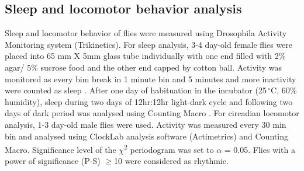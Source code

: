 \subsection*{Sleep and locomotor behavior analysis}

Sleep and locomotor behavior of flies were measured using Drosophila Activity Monitoring system (Trikinetics).
For sleep analysis, 3-4 day-old female flies were placed into 65 mm X 5mm glass tube individually with one end filled with 2\% agar/ 5\% sucrose food and the other end capped by cotton ball.
Activity was monitored as every bim break in 1 minute bin and 5 minutes and more inactivity were counted as sleep \cite{Shaw:2000ui}.
After one day of habituation in the incubator (25$\,^{\circ}\mathrm{C}$, 60\% humidity), sleep during two days of 12hr:12hr light-dark cycle and following two days of dark period was analysed using Counting Macro \cite{pfeiffenberger:2010ab}.
For circadian locomotor analysis, 1-3 day-old male flies were used. Activity was measured every 30 min bin and analysed using ClockLab analysis software (Actimetrics) and Counting Macro\cite{pfeiffenberger:2010aa}. Significance level of the $\chi$\textsuperscript{2} periodogram was set to $\alpha$ = 0.05.
Flies with a power of significance (P-S) $\geq$10 were considered as rhythmic.
  
  
  
  
  
  
  
  
  
  
  
  
  